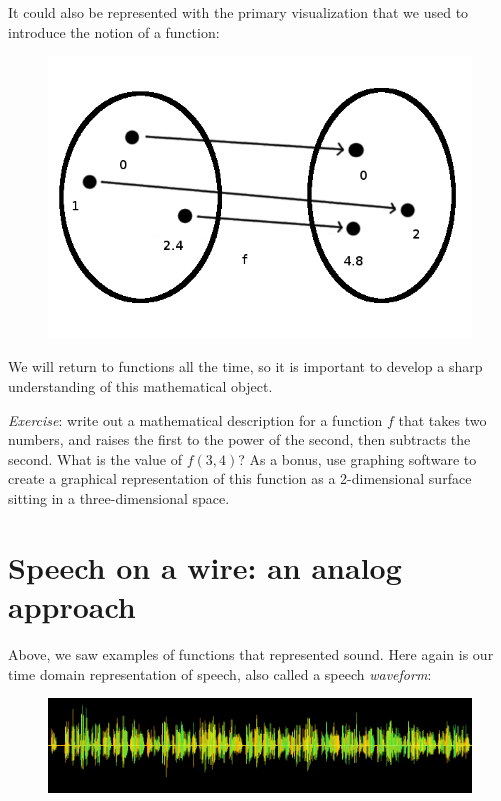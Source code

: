 \documentclass[UTF8]{book}
\begin{document}
\begin{CJK}{UTF8}{gbsn}
It could also be represented with the primary visualization that we used to introduce the notion of a function:

\begin{figure}[H]
\centering
\includegraphics[width=0.8\linewidth]{function_2x}
\end{figure}

We will return to functions all the time, so it is important to develop a sharp understanding of this mathematical object. \newline

\emph{Exercise}: write out a mathematical description for a function $f$ that takes two numbers, and raises the first to the power of the second, then subtracts the second. What is the value of $f(3,4)$? As a bonus, use graphing software to create a graphical representation of this function as a 2-dimensional surface sitting in a three-dimensional space.

\section{Speech on a wire: an analog approach}

Above, we saw examples of functions that represented sound. Here again is our time domain representation of speech, also called a speech \emph{waveform}:

\begin{figure}[H]
\centering
\includegraphics[width=0.8\linewidth]{shakespeare_speech}
\end{figure}


\end{CJK}
\end{document}
